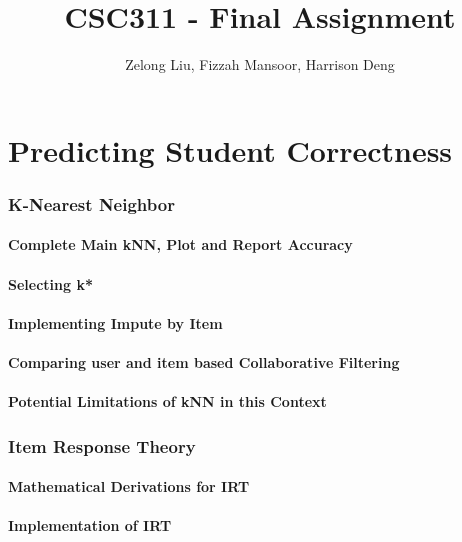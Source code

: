 \documentclass{article}
\title{CSC311 - Final Assignment}
\author{Zelong Liu, Fizzah Mansoor, Harrison Deng}
\begin{document}
    \maketitle

    \pagebreak

    \tableofcontents

    \pagebreak
    
    \part{Predicting Student Correctness}
    
    \section{K-Nearest Neighbor}
    \subsection{Complete Main kNN, Plot and Report Accuracy}
    \subsection{Selecting k*}
    \subsection{Implementing Impute by Item}
    \subsection{Comparing user and item based Collaborative Filtering}
    \subsection{Potential Limitations of kNN in this Context}

    \pagebreak

    \section{Item Response Theory}
    \subsection{Mathematical Derivations for IRT}
    \subsection{Implementation of IRT}
\end{document}
